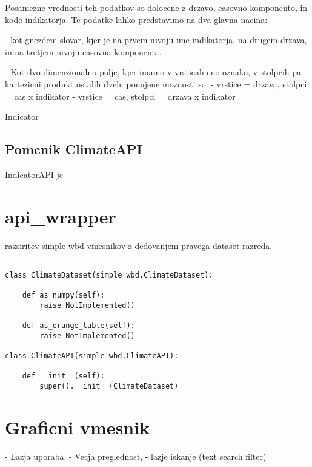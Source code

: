 Posamezne vrednosti teh podatkov so dolocene z drzavo, casovno komponento, in
kodo indikatorja. Te podatke lahko predstavimo na dva glavna nacina:

 - kot gnezdeni slovar, kjer je na prvem nivoju ime indikatorja, na drugem
   drzava, in na tretjem nivoju casovna komponenta.

 - Kot dvo-dimenzionalno polje, kjer imamo v vrsticah eno oznako, v stolpcih
   pa kartezicni produkt ostalih dveh. ponujene moznosti so:
   - vrstice = drzava, stolpci = cas x indikator
   - vrstice = cas, stolpci = drzava x indikator


Indicator



% 
% 
% 
% 
% 
% 




\subsection{Pomcnik ClimateAPI}

IndicatorAPI je 



% 
% 



\section{api\_wrapper}



razsiritev simple wbd vmesnikov z dedovanjem pravega dataset razreda.

\begin{verbatim}

class ClimateDataset(simple_wbd.ClimateDataset):
    
    def as_numpy(self):
        raise NotImplemented()
    
    def as_orange_table(self):
        raise NotImplemented()

class ClimateAPI(simple_wbd.ClimateAPI):

    def __init__(self):
        super().__init__(ClimateDataset)
\end{verbatim}





\section{Graficni vmesnik}


- Lazja uporaba.
- Vecja preglednost,
- lazje iskanje (text search filter)
